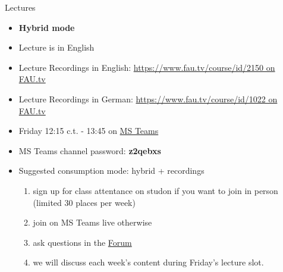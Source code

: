 \begin{frame}[c]{Lectures}
	\begin{itemize}
		\setlength\itemsep{0.4cm}
		\item \textbf{Hybrid mode}
		\item Lecture is in English
		\item Lecture Recordings in English: \href{https://www.fau.tv/course/id/2150}{https://www.fau.tv/course/id/2150 on FAU.tv}
		\item Lecture Recordings in German: \href{https://www.fau.tv/course/id/1022}{https://www.fau.tv/course/id/1022 on FAU.tv}
		\item Friday 12:15 c.t. - 13:45 on \href{https://teams.microsoft.com/l/team/19\%3adRCxup9jUsjM31xr9T4jdAFDB-ImEk_lU5Fy05ijYx81\%40thread.tacv2/conversations?groupId=6b2df36b-cec0-46b3-83d2-b4e6d1c6ac30\&tenantId=b2efcef3-8496-40b8-9de8-f135982f3461}{MS Teams}
		\item MS Teams channel password: \textbf{z2qebxs}
		\item Suggested consumption mode: hybrid + recordings
		\begin{enumerate}
			\item sign up for class attentance on studon if you want to join in person (limited 30 places per week)
                        \item join on MS Teams live otherwise
			\item ask questions in the \href{https://www.studon.fau.de/studon/goto.php?target=frm_4685856}{Forum}
			\item we will discuss each week's content during Friday's lecture slot.
		\end{enumerate}
	\end{itemize}
\end{frame}

